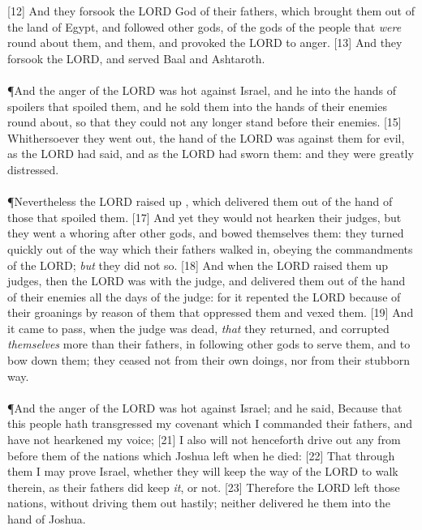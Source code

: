 [12] \textcolor[cmyk]{0.99998,1,0,0}{And they forsook the LORD God of their fathers, which brought them out of the land of Egypt, and followed other gods, of the gods of the people that \emph{were} round about them, and   them, and provoked the LORD to anger.}
[13] \textcolor[cmyk]{0.99998,1,0,0}{And they forsook the LORD, and served Baal and Ashtaroth.}\\
\\
\P \textcolor[cmyk]{0.99998,1,0,0}{And the anger of the LORD was hot against Israel, and he  into the hands of spoilers that spoiled them, and he sold them into the hands of their enemies round about, so that they could not any longer stand before their enemies.}
[15] \textcolor[cmyk]{0.99998,1,0,0}{Whithersoever they went out, the hand of the LORD was against them for evil, as the LORD had said, and as the LORD had sworn  them: and they were greatly distressed.}\\
\\
\P \textcolor[cmyk]{0.99998,1,0,0}{Nevertheless the LORD raised up , which delivered them out of the hand of those that spoiled them.}
[17] \textcolor[cmyk]{0.99998,1,0,0}{And yet they would not hearken  their judges, but they went a whoring after other gods, and bowed themselves  them: they turned quickly out of the way which their fathers walked in, obeying the commandments of the LORD; \emph{but} they did not so.}
[18] \textcolor[cmyk]{0.99998,1,0,0}{And when the LORD raised them up judges, then the LORD was with the judge, and delivered them out of the hand of their enemies all the days of the judge: for it repented the LORD because of their groanings by reason of them that oppressed them and vexed them.}
[19] \textcolor[cmyk]{0.99998,1,0,0}{And it came to pass, when the judge was dead, \emph{that} they returned, and corrupted \emph{themselves} more than their fathers, in following other gods to serve them, and to bow down  them; they ceased not from their own doings, nor from their stubborn way.}\\
\\
\P \textcolor[cmyk]{0.99998,1,0,0}{And the anger of the LORD was hot against Israel; and he said, Because that this people hath transgressed my covenant which I commanded their fathers, and have not hearkened  my voice;}
[21] \textcolor[cmyk]{0.99998,1,0,0}{I also will not henceforth drive out any from before them of the nations which Joshua left when he died:}
[22] \textcolor[cmyk]{0.99998,1,0,0}{That through them I may prove Israel, whether they will keep the way of the LORD to walk therein, as their fathers did keep \emph{it}, or not.}
[23] \textcolor[cmyk]{0.99998,1,0,0}{Therefore the LORD left those nations, without driving them out hastily; neither delivered he them into the hand of Joshua.}